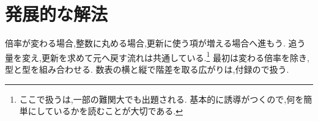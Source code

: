 
\section{発展的な解法}\label{節：発展的な解法}
倍率が変わる場合,整数に丸める場合,更新に使う項が増える場合へ進もう.
追う量を変え,更新を求めて元へ戻す流れは共通している.\footnote{ここで扱うは,一部の難関大でも出題される.
  基本的に誘導がつくので,何を簡単にしているかを読むことが大切である.}
最初は変わる倍率を除き,型と型を組み合わせる.
数表の横と縦で階差を取る広がりは,付録ので扱う.





